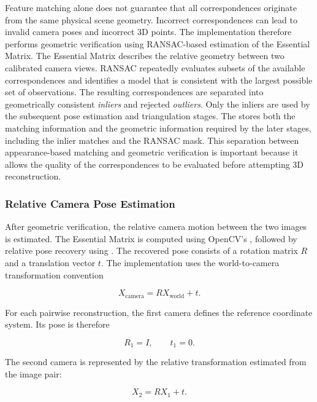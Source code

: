 Feature matching alone does not guarantee that all correspondences originate
from the same physical scene geometry. Incorrect correspondences can lead to
invalid camera poses and incorrect 3D points.
The implementation therefore performs geometric verification using
RANSAC-based estimation of the Essential Matrix.
The Essential Matrix describes the relative geometry between two calibrated
camera views. RANSAC repeatedly evaluates subsets of the available
correspondences and identifies a model that is consistent with the largest
possible set of observations.
The resulting correspondences are separated into geometrically consistent
\textit{inliers} and rejected \textit{outliers}. Only the inliers are used by
the subsequent pose estimation and triangulation stages.
The  stores both the matching information and the geometric
information required by the later stages, including the inlier matches and
the RANSAC mask.
This separation between appearance-based matching and geometric verification
is important because it allows the quality of the correspondences to be
evaluated before attempting 3D reconstruction.

\subsubsection{Relative Camera Pose Estimation}

After geometric verification, the relative camera motion between the two
images is estimated.
The Essential Matrix is computed using OpenCV's
, followed by relative pose recovery using
.
The recovered pose consists of a rotation matrix $R$ and a translation vector
$t$. The implementation uses the world-to-camera transformation convention

\begin{equation}
X_{\mathrm{camera}} =
R X_{\mathrm{world}} + t.
\end{equation}

For each pairwise reconstruction, the first camera defines the reference
coordinate system. Its pose is therefore

\begin{equation}
R_1 = I,
\qquad
t_1 = 0.
\end{equation}

The second camera is represented by the relative transformation estimated
from the image pair:

\begin{equation}
X_2 = R X_1 + t.
\end{equation}

